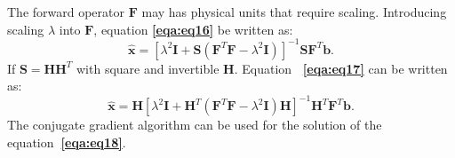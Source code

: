 The forward operator $\mathbf{F}$ may has physical units that require scaling. Introducing 
scaling $\lambda$ into $\mathbf{F}$, equation \textbf{\ref{eqa:eq16}} be written as:
\begin{equation}
    \label{eqa:eq17}
    \mathbf{\hat{x}} = \left[\lambda^2\mathbf{I} + \mathbf{S}\left(\mathbf{F}^T\mathbf{F}-\lambda^2\mathbf{I}\right)\right]^{-1}\mathbf{SF}^T\mathbf{b}.
\end{equation}
If $\mathbf{S}=\mathbf{HH}^T$ with square and invertible $\mathbf{H}$. Equation \textbf{~\ref{eqa:eq17}} can be written as:
\begin{equation}
    \label{eqa:eq18}
    \mathbf{\hat{x}} = \mathbf{H}\left[\lambda^2\mathbf{I} + \mathbf{H}^T\left(\mathbf{F}^T\mathbf{F}-\lambda^2\mathbf{I}\right)\mathbf{H}\right]^{-1}\mathbf{H}^T\mathbf{F}^T\mathbf{b}.
\end{equation}
The conjugate gradient algorithm can be used for the solution of the equation\textbf{~\ref{eqa:eq18}}.

